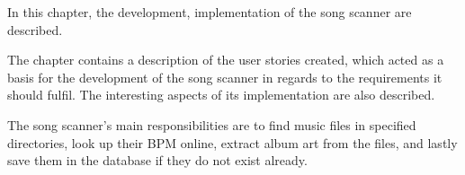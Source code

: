 In this chapter, the development, implementation of the song scanner are described. 

The chapter contains a description of the user stories created, which acted as a basis for the development of the song scanner in regards to the requirements it should fulfil. The interesting aspects of its implementation are also described. 

The song scanner's main responsibilities are to find music files in specified directories, look up their BPM online, extract album art from the files, and lastly save them in the database if they do not exist already.